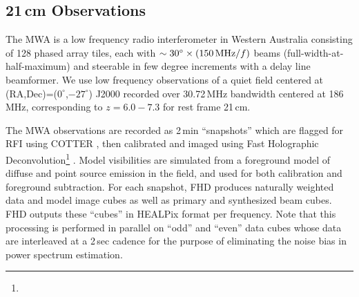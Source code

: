 \documentclass[numberedappendix]{emulateapj}
\begin{document}
\subsection{21\,cm Observations}
\label{sec:mwaobservations}

The MWA is a low frequency radio interferometer in Western Australia consisting of 128 phased array tiles, each with $\sim30^\circ\times(150\text{\,MHz}/f)$  beams (full-width-at-half-maximum) and steerable in few degree increments with a delay line beamformer. We use low frequency observations of a quiet field centered at (RA,Dec)=($0^\circ$,$-27^\circ$) J2000 recorded over 30.72\,MHz bandwidth centered at 186\,MHz, corresponding to $z=6.0-7.3$ for rest frame 21\,cm. 

The MWA observations are recorded as 2\,min ``snapshots'' which are flagged for RFI using COTTER \citep{AndreMWARFI}, then calibrated and imaged using Fast Holographic Deconvolution\footnote{} \citep{fhd}. Model visibilities are simulated from a foreground model of diffuse \citep{beardsley16} and point source \citep{PattiCatalog1} emission in the field, and used for both calibration and foreground subtraction. For each snapshot, FHD produces naturally weighted data and model image cubes as well as primary and synthesized beam cubes. FHD outputs these ``cubes'' in HEALPix format per frequency. Note that this processing is performed in parallel on ``odd'' and ``even'' data cubes whose data are interleaved at a 2\,sec cadence for the purpose of eliminating the noise bias in power spectrum estimation. 
\end{document}
